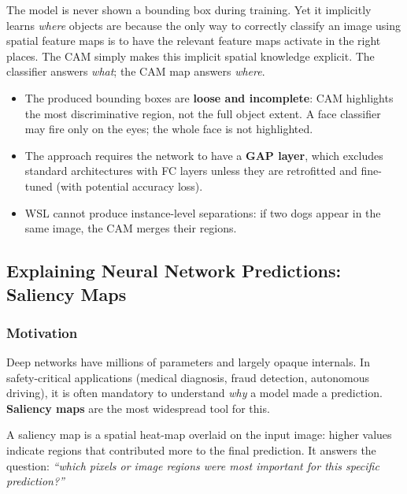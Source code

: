 \documentclass[11pt,a4paper]{article}
\newcommand{\term}[1]{\textcolor{DefGreen}{\textbf{#1}}\index{#1}}
\begin{document}
\begin{insightbox}
The model is never shown a bounding box during training. Yet it implicitly learns \emph{where} objects are because the only way to correctly classify an image using spatial feature maps is to have the relevant feature maps activate in the right places. The CAM simply makes this implicit spatial knowledge explicit. The classifier answers \emph{what}; the CAM map answers \emph{where}.
\end{insightbox}

\begin{warnbox}
\begin{itemize}
  \item The produced bounding boxes are \textbf{loose and incomplete}: CAM highlights the most discriminative region, not the full object extent. A face classifier may fire only on the eyes; the whole face is not highlighted.
  \item The approach requires the network to have a \textbf{GAP layer}, which excludes standard architectures with FC layers unless they are retrofitted and fine-tuned (with potential accuracy loss).
  \item WSL cannot produce instance-level separations: if two dogs appear in the same image, the CAM merges their regions.
\end{itemize}
\end{warnbox}

\subsection{Explaining Neural Network Predictions: Saliency Maps}
\label{sec:saliency}

\subsubsection{Motivation}

Deep networks have millions of parameters and largely opaque internals. In safety-critical applications (medical diagnosis, fraud detection, autonomous driving), it is often mandatory to understand \emph{why} a model made a prediction. \term{Saliency maps} are the most widespread tool for this.

A saliency map is a spatial heat-map overlaid on the input image: higher values indicate regions that contributed more to the final prediction. It answers the question: \emph{``which pixels or image regions were most important for this specific prediction?''}
\end{document}
